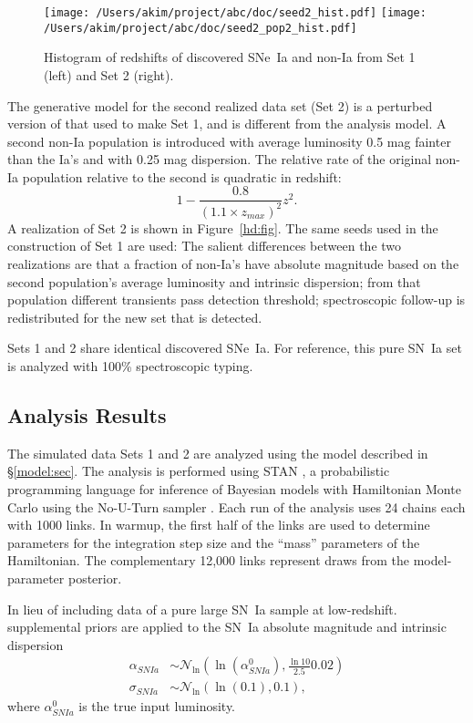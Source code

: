 \documentclass[preprint,3p]{elsarticle}
\begin{document}
\begin{figure}[htbp] %
   \centering
   \texttt{[image: /Users/akim/project/abc/doc/seed2\_hist.pdf]}
   \texttt{[image: /Users/akim/project/abc/doc/seed2\_pop2\_hist.pdf]}  
\caption{Histogram of redshifts of discovered SNe~Ia and non-Ia from Set 1 (left)
and Set 2  (right).
   \label{hist:fig}}
\end{figure}

The generative model for the second realized data set (Set 2)
is a perturbed version of that used to make Set 1, and is different from the analysis model.
A second non-Ia population is introduced with average luminosity 0.5 mag fainter
than the Ia's and with 0.25 mag dispersion.
The relative rate of the original non-Ia population relative to the second is quadratic
in redshift:
\begin{equation}
1 -\frac{0.8}{\left(1.1\times z_{max}\right)^2}z^2.
\end{equation}
A realization of Set 2 is shown in Figure~\ref{hd:fig}.
The same seeds used in the construction of Set 1 are used:  The salient differences
between the two realizations are that a fraction of non-Ia's have absolute magnitude
based on the second population's average luminosity and intrinsic dispersion; from
that population different transients pass detection threshold; spectroscopic follow-up is redistributed
for the new set that is detected.

Sets 1 and 2 share identical discovered SNe~Ia.  For reference, this pure SN~Ia
set is analyzed with 100\% spectroscopic typing. 


\subsection{Analysis Results}
The simulated data Sets 1 and 2 are analyzed using the model described
in \S\ref{model:sec}.  The analysis is performed using STAN 
\citep{stan-software:2015},
a probabilistic programming language for
inference of Bayesian models with Hamiltonian Monte Carlo
using the No-U-Turn sampler \citep{Homan:2014:NSA:2627435.2638586}.  Each run of the analysis
uses 24 chains each with 1000 links.  In warmup, the first half of the links are used to
determine parameters for the integration step size and the ``mass''
parameters of the Hamiltonian. The complementary
12,000 links represent draws from the model-parameter posterior.

In lieu of including data of
a pure large SN~Ia sample at low-redshift.
supplemental priors are applied to the SN~Ia absolute magnitude and intrinsic dispersion
\begin{align}
\alpha_{SNIa} & \sim \mathcal{N}_{\ln}\left(\ln\left(\alpha^0_{SNIa}\right),\frac{\ln{10}}{2.5}0.02\right)\\
\sigma_{SNIa} & \sim \mathcal{N}_{\ln}\left(\ln\left(0.1\right),0.1\right),
\end{align}
where $\alpha^0_{SNIa}$ is the true input luminosity.
\end{document}
